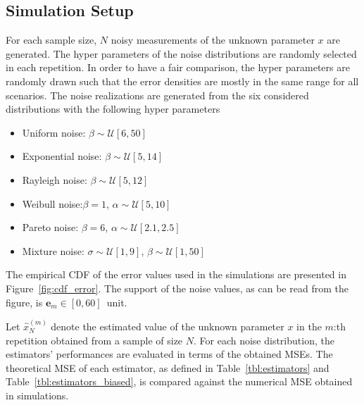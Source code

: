 \documentclass{article}
\begin{document}
\subsection{Simulation Setup}
For each sample size, $N$ noisy measurements of the unknown parameter $x$ are generated. The hyper parameters of the noise distributions are randomly selected in each repetition. In order to have a fair comparison, the hyper parameters are randomly drawn such that the error densities are mostly in the same range for all scenarios. The noise realizations are generated from the six considered distributions with the following hyper parameters
%
%
\begin{itemize}
	\item Uniform noise: $\beta\sim\mathcal{U}[6,50]$
	\item Exponential noise: $\beta\sim\mathcal{U}[5,14]$
	\item Rayleigh noise: $\beta\sim\mathcal{U}[5,12]$
	\item Weibull noise:$\beta=1$, $\alpha\sim\mathcal{U}[5,10]$
	\item Pareto noise: $\beta=6$, $\alpha\sim\mathcal{U}[2.1,2.5]$
	\item Mixture noise: $\sigma\sim\mathcal{U}[1,9]$, $\beta\sim\mathcal{U}[1,50]$
\end{itemize} 
%
%
The empirical CDF of the error values used in the simulations are presented in Figure~\ref{fig:cdf_error}. The support of the noise values, as can be read from the figure, is $\bm{e}_m\in[0,60]$\, unit.


Let $\hat{x}_N^{(m)}$ denote the estimated value of the unknown parameter $x$  in the $m$:th repetition obtained from a sample of size $N$. For each noise distribution, the estimators' performances are evaluated in terms of the obtained MSEs. The theoretical MSE of each estimator, as defined in Table~\ref{tbl:estimators} and Table~\ref{tbl:estimators_biased}, is compared against the numerical MSE obtained in simulations. 
\end{document}

